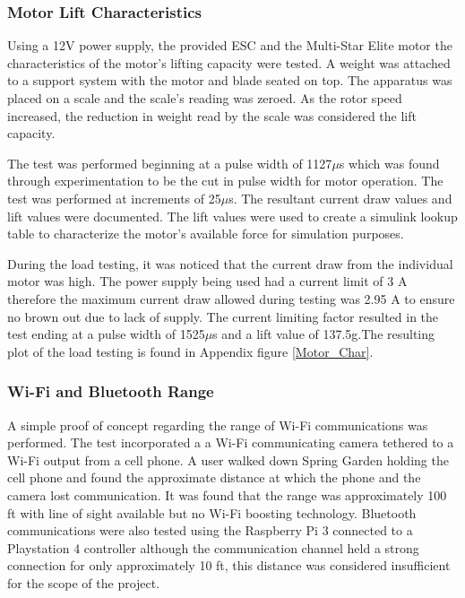  \subsubsection{Motor Lift Characteristics}
 
 Using a 12V power supply, the provided ESC and the Multi-Star Elite motor the characteristics of the motor's lifting capacity were tested. A weight was attached to a support system with the motor and blade seated on top. The apparatus was placed on a scale and the scale's reading was zeroed. As the rotor speed increased, the reduction in weight read by the scale was considered the lift capacity.
 
 The test was performed beginning at a pulse width of 1127$\mu$s which was found through experimentation to be the cut in pulse width for motor operation. The test was performed at increments of 25$\mu$s. The resultant current draw values and lift values were documented. The lift values were used to create a simulink lookup table to characterize the motor's available force for simulation purposes. 
 
 During the load testing, it was noticed that the current draw from the individual motor was high. The power supply being used had a current limit of 3 A therefore the maximum current draw allowed during testing was 2.95 A to ensure no brown out due to lack of supply. The current limiting factor resulted in the test ending at a pulse width of 1525$\mu$s and a lift value of 137.5g.The resulting plot of the load testing is found in Appendix figure \ref{Motor_Char}.

  \subsubsection{Wi-Fi and Bluetooth Range}
  
  A simple proof of concept regarding the range of Wi-Fi communications was performed. The test incorporated a a Wi-Fi communicating camera tethered to a Wi-Fi output from a cell phone. A user walked down Spring Garden holding the cell phone and found the approximate distance at which the phone and the camera lost communication. It was found that the range was approximately 100 ft with line of sight available but no Wi-Fi boosting technology. Bluetooth communications were also tested using the Raspberry Pi 3 connected to a Playstation 4 controller although the communication channel held a strong connection for only approximately 10 ft, this distance was considered insufficient for the scope of the project.
  
